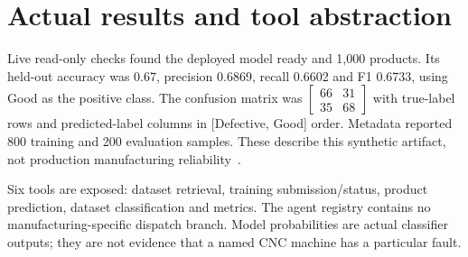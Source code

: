 \section{Actual results and tool abstraction}
Live read-only checks found the deployed model ready and 1,000 products. Its held-out accuracy was 0.67, precision 0.6869, recall 0.6602 and F1 0.6733, using Good as the positive class. The confusion matrix was $\left[\begin{smallmatrix}66&31\\35&68\end{smallmatrix}\right]$ with true-label rows and predicted-label columns in [Defective, Good] order. Metadata reported 800 training and 200 evaluation samples. These describe this synthetic artifact, not production manufacturing reliability~\cite{mlrecord}.
\begin{center}\end{center}
Six tools are exposed: dataset retrieval, training submission/status, product prediction, dataset classification and metrics. The agent registry contains no manufacturing-specific dispatch branch. Model probabilities are actual classifier outputs; they are not evidence that a named CNC machine has a particular fault.

